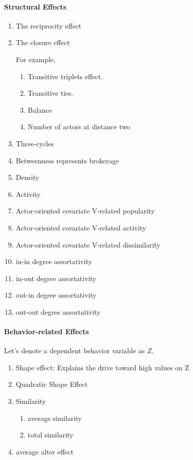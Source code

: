\documentclass[11pt]{report}
\begin{document}
\paragraph{Structural Effects}
\begin{enumerate}
\item{The reciprocity effect}
\item{The closure effect}

For example, 
\begin{enumerate}
\item Transitive triplets effect. 
\item Transitive ties.
\item Balance
\item Number of actors at distance two
\end{enumerate}
\item{Three-cycles}
\item{Betweenness}
represents brokerage
\item{Density}
\item{Activity}
\item{Actor-oriented covariate V-related popularity}
\item{Actor-oriented covariate V-related activity}
\item{Actor-oriented covariate V-related dissimilarity}
\item{in-in degree assortativity}
\item{in-out degree assortativity}
\item{out-in degree assortativity}
\item{out-out degree assortativity}
\end{enumerate}

\paragraph{Behavior-related Effects\\}
Let's denote a dependent behavior variable as $Z$.
\begin{enumerate}
\item{Shape effect: Explains the drive toward high values on Z}

\item{Quadratic Shape Effect}
\item{Similarity}
\begin{enumerate}
\item{average similarity}
\item{total similarity}
\end{enumerate}
\item{average alter effect}
\end{enumerate}
\end{document}
